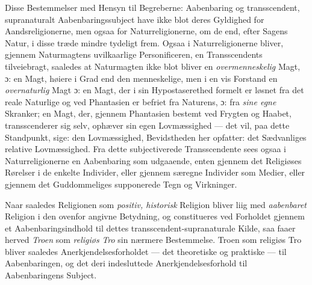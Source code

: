 \documentclass[12pt,a4paper]{book}
\newcommand{\opage}[1]{\marginnote{\footnotesize\textit{[#1]}}}
\begin{document}
Disse Bestemmelser med Hensyn til Begreberne: Aabenbaring og transscendent,
supranaturalt Aabenbaringssubject have ikke blot deres Gyldighed for
Aandsreligionerne, men ogsaa for Naturreligionerne, om de end, efter Sagens
Natur, i disse træde mindre tydeligt frem. Ogsaa i Naturreligionerne bliver,
gjennem Naturmagtens uvilkaarlige Personificeren, en Transscendents tilveiebragt,
saaledes at Naturmagten ikke blot bliver en \emph{overmenneskelig} Magt, ɔ: en
Magt, høiere i Grad end den menneskelige, men i en vis Forstand en
\emph{overnaturlig} Magt ɔ: en Magt, der i sin Hypostaserethed formelt er løsnet
fra det reale Naturlige og ved Phantasien er befriet fra Naturens, ɔ: fra \emph{sine egne} Skranker; en Magt, der, gjennem Phantasien bestemt ved Frygten og Haabet,
transscenderer sig selv, ophæver sin egen Lovmæssighed --- det vil, paa dette
Standpunkt, sige: den Lovmæssighed, Bevidstheden her opfatter: det Sædvanliges
relative Lovmæssighed. Fra dette subjectiverede Transscendente sees ogsaa i
Naturreligionerne en Aabenbaring som udgaaende, enten gjennem det Religiøses
Rørelser i de enkelte Individer, eller gjennem særegne Individer som Medier, eller
gjennem det Guddommeliges supponerede Tegn og Virkninger.

Naar saaledes Religionen som \emph{positiv, historisk} Religion bliver liig med \emph{aabenbaret} Religion i den ovenfor angivne Betydning, og constitueres ved
Forholdet gjennem et Aabenbaringsindhold til dettes transscendent-supranaturale
Kilde, saa faaer herved \emph{Troen} som \emph{religiøs} \opage{40}\emph{Tro} sin nærmere Bestemmelse. Troen som
religiøs Tro bliver saaledes Anerkjendelsesforholdet --- det theoretiske og
praktiske --- til Aabenbaringen, og det deri indesluttede Anerkjendelsesforhold
til Aabenbaringens Subject.
\end{document}
